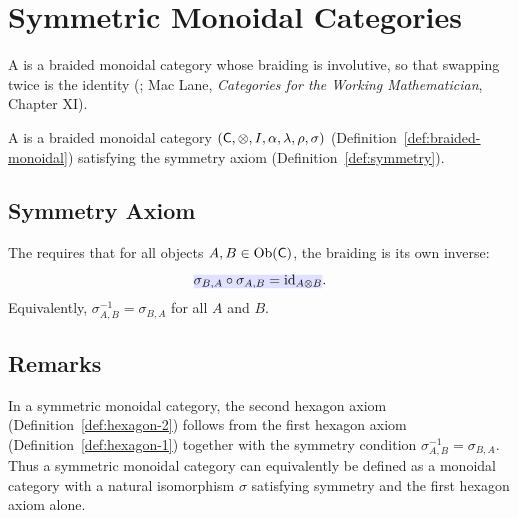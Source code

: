 \documentclass[../preamble]{subfiles}
\begin{document}
\section{Symmetric Monoidal Categories}
\label{sec:symmetric-monoidal}

A  is a braided monoidal category
whose braiding is involutive,
so that swapping twice is the identity
(;
Mac Lane, \emph{Categories for the Working Mathematician}, Chapter XI).

\begin{definition}
  \label{def:symmetric-monoidal}
  A 
  is a braided monoidal category
  $(\mathsf{C}, \otimes, I, \alpha, \lambda, \rho, \sigma)$
  (Definition~\ref{def:braided-monoidal})
  satisfying the symmetry axiom
  (Definition~\ref{def:symmetry}).
\end{definition}

\subsection{Symmetry Axiom}

\begin{definition}
  \label{def:symmetry}
  The  requires that
  for all objects $A, B \in \operatorname{Ob}(\mathsf{C})$,
  the braiding is its own inverse:
  \begin{equation}
    \label{eq:symmetry}
    \newmath{\sigma_{B,A} \circ \sigma_{A,B} = \id_{A \otimes B}}.
  \end{equation}
  Equivalently,
  $\sigma_{A,B}^{-1} = \sigma_{B,A}$
  for all $A$ and $B$.
\end{definition}

\subsection{Remarks}

\begin{remark}
  \label{rem:second-hexagon-redundant}
  In a symmetric monoidal category,
  the second hexagon axiom
  (Definition~\ref{def:hexagon-2})
  follows from the first hexagon axiom
  (Definition~\ref{def:hexagon-1})
  together with the symmetry condition $\sigma_{A,B}^{-1} = \sigma_{B,A}$.
  Thus a symmetric monoidal category can equivalently be defined as
  a monoidal category with a natural isomorphism $\sigma$
  satisfying symmetry and the first hexagon axiom alone.
\end{remark}
\end{document}
